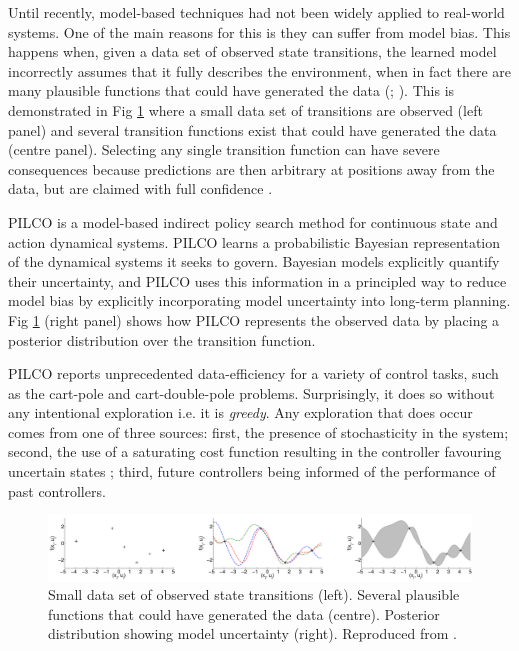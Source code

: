 Until recently, model-based techniques had not been widely applied to real-world systems. One of the main reasons for this is they can suffer from model bias. This happens when, given a data set of observed state transitions, the learned model incorrectly assumes that it fully describes the environment, when in fact there are many plausible functions that could have generated the data (\cite{atkeson1997comparison}; \cite{schneider1997exploiting}). This is demonstrated in Fig \ref{Fig:model-bias} where a small data set of transitions are observed (left panel) and several transition functions exist that could have generated the data (centre panel). Selecting any single transition function can have severe consequences because predictions are then arbitrary at positions away from the data, but are claimed with full confidence \citep{deisenroth2011pilco}. 

PILCO \citep{deisenroth2011pilco} is a model-based indirect policy search method for continuous state and action dynamical systems. PILCO learns a probabilistic Bayesian representation of the dynamical systems it seeks to govern. Bayesian models explicitly quantify their uncertainty, and PILCO uses this information in a principled way to reduce model bias by explicitly incorporating model uncertainty into long-term planning. Fig \ref{Fig:model-bias} (right panel) shows how PILCO represents the observed data by placing a posterior distribution over the transition function. 

PILCO reports unprecedented data-efficiency for a variety of control tasks, such as the cart-pole and cart-double-pole problems. Surprisingly, it does so without any intentional exploration i.e. it is \textit{greedy}. Any exploration that does occur comes from one of three sources: first, the presence of stochasticity in the system; second, the use of a saturating cost function resulting in the controller favouring uncertain states \citep{deisenroth2013gaussian}; third, future controllers being informed of the performance of past controllers. 

\begin{figure}
\centering    
\includegraphics[width=1.0\textwidth]{Chapter1/Figures/PILCO-model-bias.png}
\caption[Model-based bias in reinforcement learning]{Small data set of observed state transitions (left). Several plausible functions that could have generated the data (centre). Posterior distribution showing model uncertainty (right). Reproduced from \citep{deisenroth2011pilco}.}
\label{Fig:model-bias}
\end{figure}

